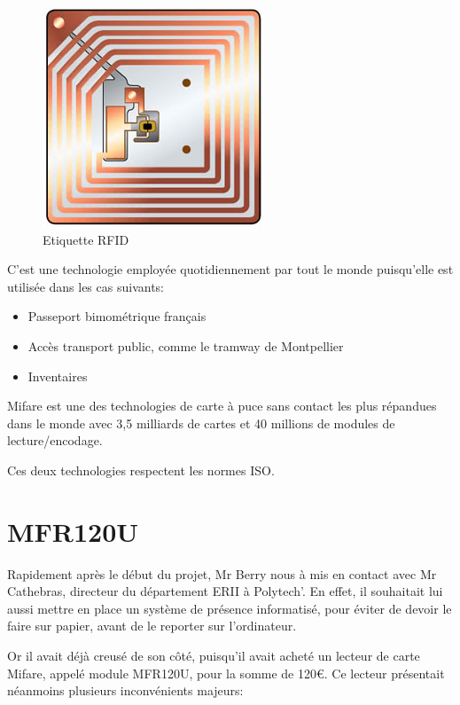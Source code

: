     \begin{figure}[h]
        \begin{center}
            \includegraphics[scale=0.6]{images/RFIDtag.jpg} 
        \end{center}

        \caption{Etiquette RFID}
        \label{Etiquette RFID}
    \end{figure}


C'est une technologie employée quotidiennement par tout le monde puisqu'elle
est utilisée dans les cas suivants:

    \begin{itemize}
    \item Passeport bimométrique français
    \item Accès transport public, comme le tramway de Montpellier
    \item Inventaires
    \end{itemize}

Mifare est une des technologies de carte à puce sans contact les plus répandues
dans le monde avec 3,5 milliards de cartes et 40 millions de modules de lecture/encodage.

Ces deux technologies respectent les normes ISO.


    \section{MFR120U}
Rapidement après le début du projet, Mr Berry nous à mis en contact avec Mr
Cathebras, directeur du département ERII à Polytech'. En effet, il souhaitait lui
aussi mettre en place un système de présence informatisé, pour éviter de devoir
le faire sur papier, avant de le reporter sur l'ordinateur.

Or il avait déjà creusé de son côté, puisqu'il avait acheté un lecteur de carte 
Mifare, appelé module MFR120U, pour la somme de 120\euro. Ce lecteur présentait néanmoins
plusieurs inconvénients majeurs:

